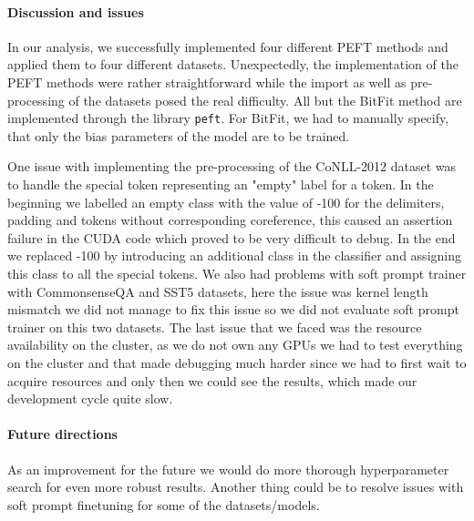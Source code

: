 
\paragraph{Discussion and issues} In our analysis, we successfully implemented four different PEFT methods and applied them to four different datasets. Unexpectedly, the implementation of the PEFT methods were rather straightforward while the import as well as pre-processing of the datasets posed the real difficulty. All but the BitFit method are implemented through the library \lstinline{peft}. For BitFit, we had to manually specify, that only the bias parameters of the model are to be trained. 

One issue with implementing the pre-processing of the CoNLL-2012 dataset was to handle the special token representing an "empty" label for a token. In the beginning we labelled an empty class with the value of -100 for the delimiters, padding and tokens without corresponding coreference, this caused an assertion failure in the CUDA code which proved to be very difficult to debug. In the end we replaced -100 by introducing an additional class in the classifier and assigning this class to all the special tokens. We also had problems with soft prompt trainer with CommonsenseQA and SST5 datasets, here the issue was kernel length mismatch we did not manage to fix this issue so we did not evaluate soft prompt trainer on this two datasets. The last issue that we faced was the resource availability on the cluster, as we do not own any GPUs we had to test everything on the cluster and that made debugging much harder since we had to first wait to acquire resources and only then we could see the results, which made our development cycle quite slow.

\paragraph{Future directions} As an improvement for the future we would do more thorough hyperparameter search for even more robust results. Another thing could be to resolve issues with soft prompt finetuning for some of the datasets/models.